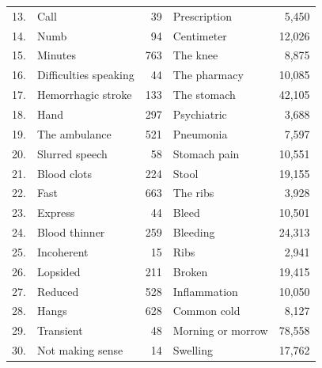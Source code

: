 \begin{frame}
\begin{table}[t]
{\begin{tabular}{l|lr|lr}
            13. & Call & 39 & Prescription & 5,450 \\        
            14. & Numb & 94 & Centimeter & 12,026 \\        
            15. & Minutes & 763 & The knee & 8,875 \\        
            16. & Difficulties speaking & 44 & The pharmacy & 10,085 \\        
            17. & Hemorrhagic stroke & 133 & The stomach & 42,105 \\        
            18. & Hand & 297 & Psychiatric & 3,688 \\        
            19. & The ambulance & 521 & Pneumonia & 7,597 \\        
            20. & Slurred speech & 58 & Stomach pain & 10,551 \\        
            21. & Blood clots & 224 & Stool & 19,155 \\        
            22. & Fast & 663 & The ribs & 3,928 \\        
            23. & Express & 44 & Bleed & 10,501 \\        
            24. & Blood thinner & 259 & Bleeding & 24,313 \\        
            25. & Incoherent & 15 & Ribs & 2,941 \\        
            26. & Lopsided & 211 & Broken & 19,415 \\        
            27. & Reduced & 528 & Inflammation & 10,050 \\        
            28. & Hangs & 628 & Common cold & 8,127 \\        
            29. & Transient & 48 & Morning or morrow & 78,558 \\        
            30. & Not making sense & 14 & Swelling & 17,762 \\        
            \bottomrule
        \end{tabular}%
        }
    \end{table}
\end{frame}


